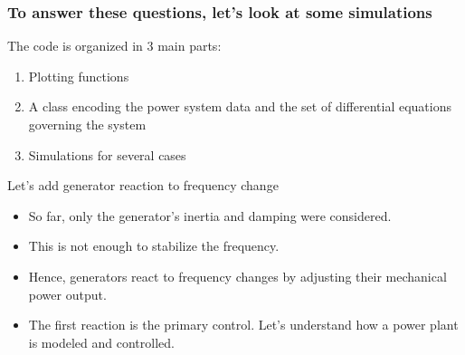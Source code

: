 \begin{frame}
    \frametitle{To answer these questions, let's look at some simulations}
    \href{https://colab.research.google.com/drive/1vARBr5wfm9uHCokRx3kcoK_RWjrOvnA5}{\color{blue}{Link to the simulations}}

    The code is organized in 3 main parts:
    \begin{enumerate}
        \item Plotting functions
        \item A class encoding the power system data and the set of differential equations governing the system
        \item Simulations for several cases
    \end{enumerate}
\end{frame}

\begin{frame}{Let's add generator reaction to frequency change}

  \begin{itemize}
    \item So far, only the generator's inertia and damping were considered.
    \item This is not enough to stabilize the frequency.
    \item Hence, generators react to frequency changes by adjusting their mechanical power output.
    \item The first reaction is the primary control. Let's understand how a power plant is modeled and controlled.
  \end{itemize}
\end{frame}

